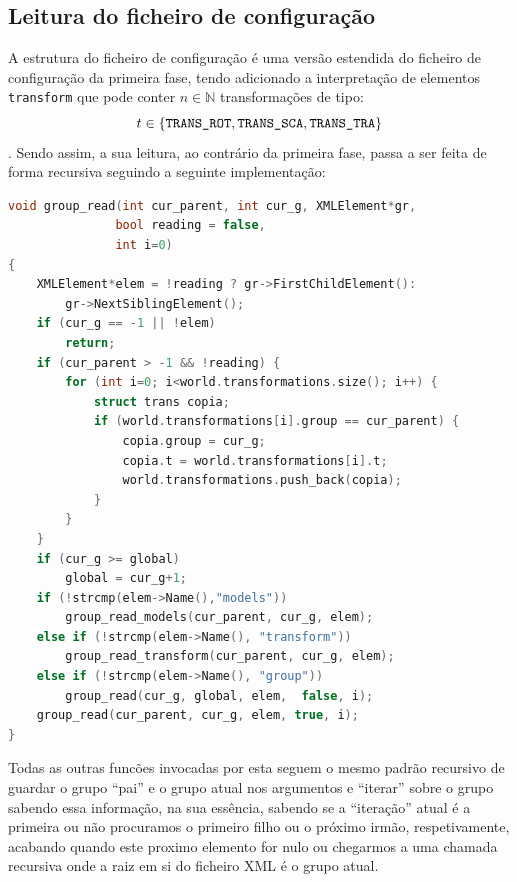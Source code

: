 \documentclass[14pt, a4paper]{article}
\begin{document}
\subsection{Leitura do ficheiro de configuração}\label{subsec:XML}
A estrutura do ficheiro de configuração é uma versão estendida do ficheiro de configuração da primeira
fase, tendo adicionado a interpretação de elementos \verb|transform| que pode conter $n\in\mathbb{N}$
transformações de tipo:$$t\in\{\verb|TRANS_ROT|,\verb|TRANS_SCA|,\verb|TRANS_TRA|\}$$.
Sendo assim, a sua leitura, ao contrário da primeira fase, passa a ser feita de forma recursiva seguindo
a seguinte implementação:
\begin{lstlisting}[language=c++]
void group_read(int cur_parent, int cur_g, XMLElement*gr,
               bool reading = false,
               int i=0)
{
	XMLElement*elem = !reading ? gr->FirstChildElement():
		gr->NextSiblingElement();
	if (cur_g == -1 || !elem)
		return;
    if (cur_parent > -1 && !reading) {
		for (int i=0; i<world.transformations.size(); i++) {
            struct trans copia;
            if (world.transformations[i].group == cur_parent) {
                copia.group = cur_g;
                copia.t = world.transformations[i].t;
                world.transformations.push_back(copia);
            }
        }
	}
	if (cur_g >= global)
		global = cur_g+1;
	if (!strcmp(elem->Name(),"models"))
		group_read_models(cur_parent, cur_g, elem);
	else if (!strcmp(elem->Name(), "transform"))
		group_read_transform(cur_parent, cur_g, elem);
	else if (!strcmp(elem->Name(), "group"))
		group_read(cur_g, global, elem,  false, i);
	group_read(cur_parent, cur_g, elem, true, i);
}
\end{lstlisting}
Todas as outras funcões invocadas por esta seguem o mesmo padrão recursivo de guardar o grupo ``pai''
e o grupo atual nos argumentos e ``iterar'' sobre o grupo sabendo essa informação, na sua essência,
sabendo se a ``iteração'' atual é a primeira ou não procuramos o primeiro filho ou o próximo irmão,
respetivamente, acabando quando este proximo elemento for nulo ou chegarmos a uma chamada recursiva onde
a raiz em si do ficheiro XML é o grupo atual.
\end{document}
